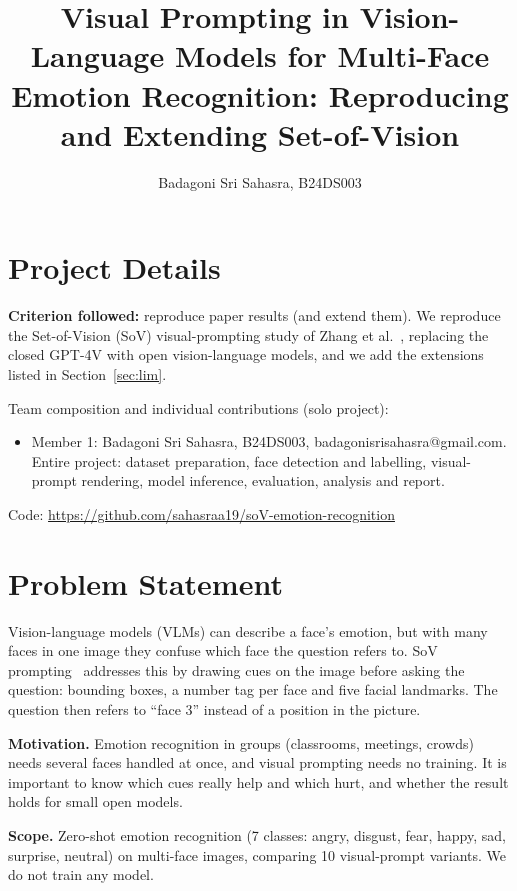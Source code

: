 \documentclass[lettersize,journal]{IEEEtran}
\begin{document}
\title{Visual Prompting in Vision-Language Models for Multi-Face Emotion Recognition: Reproducing and Extending Set-of-Vision}

\author{Badagoni Sri Sahasra, B24DS003}

\maketitle

\section{Project Details}
\textbf{Criterion followed:} reproduce paper results (and extend them). We reproduce the Set-of-Vision (SoV) visual-prompting study of Zhang et al.~\cite{zhang2024visual}, replacing the closed GPT-4V with open vision-language models, and we add the extensions listed in Section~\ref{sec:lim}.

Team composition and individual contributions (solo project):
\begin{itemize}
    \item Member 1: Badagoni Sri Sahasra, B24DS003, badagonisrisahasra@gmail.com. Entire project: dataset preparation, face detection and labelling, visual-prompt rendering, model inference, evaluation, analysis and report.
\end{itemize}
Code: \url{https://github.com/sahasraa19/soV-emotion-recognition}

\section{Problem Statement}
Vision-language models (VLMs) can describe a face's emotion, but with many faces in one image they confuse which face the question refers to. SoV prompting~\cite{zhang2024visual} addresses this by drawing cues on the image before asking the question: bounding boxes, a number tag per face and five facial landmarks. The question then refers to ``face 3'' instead of a position in the picture.

\textbf{Motivation.} Emotion recognition in groups (classrooms, meetings, crowds) needs several faces handled at once, and visual prompting needs no training. It is important to know which cues really help and which hurt, and whether the result holds for small open models.

\textbf{Scope.} Zero-shot emotion recognition (7 classes: angry, disgust, fear, happy, sad, surprise, neutral) on multi-face images, comparing 10 visual-prompt variants. We do not train any model.
\end{document}
